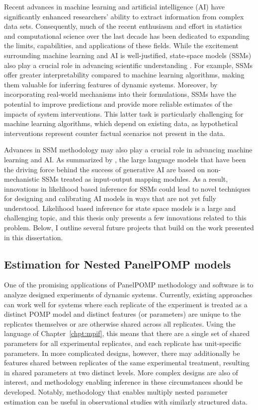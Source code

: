 Recent advances in machine learning and artificial intelligence (AI) have significantly enhanced researchers' ability to extract information from complex data sets.
Consequently, much of the recent enthusiasm and effort in statistics and computational science over the last decade has been dedicated to expanding the limits, capabilities, and applications of these fields.
While the excitement surrounding machine learning and AI is well-justified, state-space models (SSMs) also play a crucial role in advancing scientific understanding \citep{baker18,hogg24}.
For example, SSMs offer greater interpretability compared to machine learning algorithms, making them valuable for inferring features of dynamic systems.
Moreover, by incorporating real-world mechanisms into their formulations, SSMs have the potential to improve predictions and provide more reliable estimates of the impacts of system interventions.
This latter task is particularly challenging for machine learning algorithms, which depend on existing data, as hypothetical interventions represent counter factual scenarios not present in the data.

Advances in SSM methodology may also play a crucial role in advancing machine learning and AI.
As summarized by \citet{lin24}, the large language models that have been the driving force behind the success of generative AI are based on non-mechanistic SSMs treated as input-output mapping modules.
As a result, innovations in likelihood based inference for SSMs could lead to novel techniques for designing and calibrating AI models in ways that are not yet fully understood.
Likelihood based inference for state space models is a large and challenging topic, and this thesis only presents a few innovations related to this problem.
Below, I outline several future projects that build on the work presented in this dissertation.

\subsection*{Estimation for Nested PanelPOMP models}

One of the promising applications of PanelPOMP methodology and software is to analyze designed experiments of dynamic systems.
Currently, existing approaches can work well for systems where each replicate of the experiment is treated as a distinct POMP model and distinct features (or parameters) are unique to the replicates themselves or are otherwise shared across all replicates.
Using the language of Chapter~\ref{chpt:mpif}, this means that there are a single set of shared parameters for all experimental replicates, and each replicate has unit-specific parameters. 
In more complicated designs, however, there may additionally be features shared between replicates of the same experimental treatment, resulting in shared parameters at two distinct levels.
More complex designs are also of interest, and methodology enabling inference in these circumstances should be developed.
Notably, methodology that enables multiply nested parameter estimation can be useful in observational studies with similarly structured data. 

